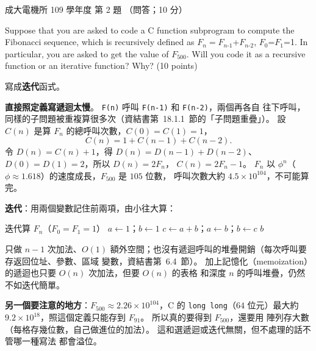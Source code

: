 \begin{pastexam}[label={px:ncku-109-ee-ds-02}]{成大電機所 109 學年度 第 2 題}
（問答；10 分）

Suppose that you are asked to code a C function subprogram to compute the Fibonacci sequence,
which is recursively defined as $F_n=F_{n\text{-}1}$+$F_{n\text{-}2}$, $F_0$=$F_1$=1. In particular,
you are asked to get the value of $F_{500}$. Will you code it as a recursive function or an
iterative function? Why? \quad (10 points)
\end{pastexam}

\begin{pastsoln}
寫成\textbf{迭代}函式。

\textbf{直接照定義寫遞迴太慢}。 \texttt{F(n)} 呼叫 \texttt{F(n-1)} 和 \texttt{F(n-2)}，兩個再各自
往下呼叫，同樣的子問題被重複算很多次（資結書第~18.1.1~節的「子問題重疊」）。 設 $C(n)$ 是算
$F_n$ 的總呼叫次數，$C(0) = C(1) = 1$，
\[
C(n) = 1 + C(n - 1) + C(n - 2) .
\]
令 $D(n) = C(n) + 1$，得 $D(n) = D(n - 1) + D(n - 2)$、$D(0) = D(1) = 2$，所以 $D(n) = 2F_n$，
$C(n) = 2F_n - 1$。 $F_n$ 以 $\phi^{n}$（$\phi \approx 1.618$）的速度成長，$F_{500}$ 是 $105$ 位數，
呼叫次數大約 $4.5 \times 10^{104}$，不可能算完。

\textbf{迭代}：用兩個變數記住前兩項，由小往大算：
\begin{pseudo}{迭代算 $F_n$（$F_0 = F_1 = 1$）}
    \State $a \gets 1$；$b \gets 1$ 
        \State $c \gets a + b$；$a \gets b$；$b \gets c$
    \EndFor
    \State \Return $b$
\EndFunction
\end{pseudo}
只做 $n - 1$ 次加法、$O(1)$ 額外空間；也沒有遞迴呼叫的堆疊開銷（每次呼叫要存返回位址、參數、區域
變數，資結書第~6.4~節）。 加上記憶化（memoization）的遞迴也只要 $O(n)$ 次加法，但要 $O(n)$ 的表格
和深度 $n$ 的呼叫堆疊，仍然不如迭代簡單。

\textbf{另一個要注意的地方}：$F_{500} \approx 2.26 \times 10^{104}$，C 的 \texttt{long long}（$64$
位元）最大約 $9.2 \times 10^{18}$，照這個定義只能存到 $F_{91}$。 所以真的要得到 $F_{500}$，還要用
陣列存大數（每格存幾位數，自己做進位的加法）。 這和選遞迴或迭代無關，但不處理的話不管哪一種寫法
都會溢位。
\end{pastsoln}
